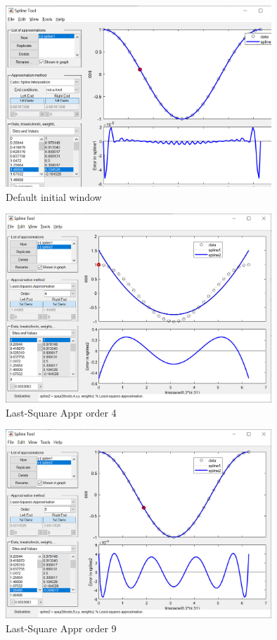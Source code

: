 \documentclass{article}
\begin{document}
\begin{figure}
\centering
\includegraphics[width=10cm]{img/default_home_window.png}
\caption{Default initial window}
\end{figure}

\begin{figure}
\centering
\includegraphics[width=10cm]{img/Last-Square_Appr4.jpg}
\caption{Last-Square Appr order 4}
\end{figure}

\begin{figure}
\centering
\includegraphics[width=10cm]{img/Last-Square_Appr9.jpg}
\caption{Last-Square Appr order 9}
\end{figure}
\end{document}
